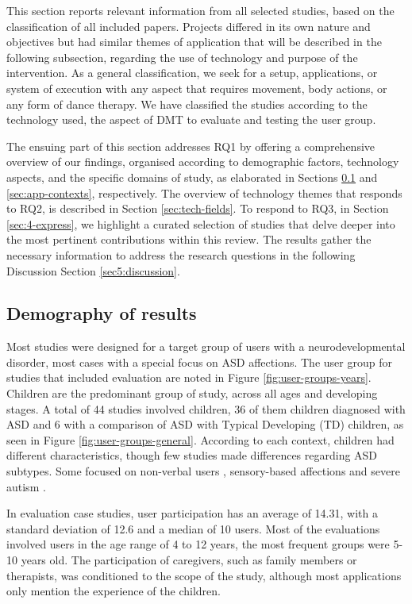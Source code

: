 \documentclass[a4paper,fleqn]{cas-sc}
\begin{document}
This section reports relevant information from all selected studies, based on the classification of all included papers. Projects differed in its own nature and objectives but had similar themes of application that will be described in the following subsection, regarding the use of technology and purpose of the intervention. As a general classification, we seek for a setup, applications, or system of execution with any aspect that requires movement, body actions, or any form of dance therapy. We have classified the studies according to the technology used, the aspect of DMT to evaluate and testing the user group.

The ensuing part of this section addresses RQ1 by offering a comprehensive overview of our findings, organised according to demographic factors, technology aspects, and the specific domains of study, as elaborated in Sections \ref{sec4:results-dem} and \ref{sec:app-contexts}, respectively. The overview of technology themes that responds to RQ2, is described in Section  \ref{sec:tech-fields}. To respond to RQ3, in Section \ref{sec:4-express}, we highlight a curated selection of studies that delve deeper into the most pertinent contributions within this review. The results gather the necessary information to address the research questions in the following Discussion Section \ref{sec5:discussion}.

\subsection{Demography of results}
\label{sec4:results-dem}
Most studies were designed for a target group of users with a neurodevelopmental disorder, most cases with a special focus on ASD affections. The user group for studies that included evaluation are noted in Figure \ref{fig:user-groups-years}. Children are the predominant group of study, across all ages and developing stages. A total of 44 studies involved children, 36 of them children diagnosed with ASD and 6 with a comparison of ASD with Typical Developing (TD) children, as seen in Figure \ref{fig:user-groups-general}. According to each context, children had different characteristics, though few studies made differences regarding ASD subtypes. Some focused on non-verbal users \cite{McGowan17, Ragone22} , sensory-based affections \cite{MarquezSegura19} and severe autism \cite{Giraud21}.

In evaluation case studies, user participation has an average of 14.31, with a standard deviation of 12.6 and a median of 10 users. Most of the evaluations involved users in the age range of 4 to 12 years, the most frequent groups were 5-10 years old. The participation of caregivers, such as family members or therapists, was conditioned to the scope of the study, although most applications only mention the experience of the children.
\end{document}
